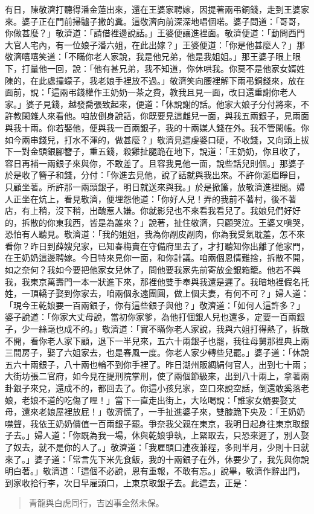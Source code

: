有日，陳敬濟打聽得潘金蓮出來，還在王婆家聘嫁，因提著兩弔銅錢，走到王婆家來。婆子正在門前掃驢子撒的糞。這敬濟向前深深地唱個喏。婆子問道：「哥哥，你做甚麼？」敬濟道：「請借裡邊說話。」王婆便讓進裡面。敬濟便道：「動問西門大官人宅內，有一位娘子潘六姐，在此出嫁？」王婆便道：「你是他甚麼人？」那敬濟嘻嘻笑道：「不瞞你老人家說，我是他兄弟，他是我姐姐。」那王婆子眼上眼下，打量他一回，說：「他有甚兄弟，我不知道，你休哄我。你莫不是他家女婿姓陳的，在此處撞蠓子，我老娘手裡放不過。」敬濟笑向腰裡解下兩弔銅錢來，放在面前，說：「這兩弔錢權作王奶奶一茶之費，教我且見一面，改日還重謝你老人家。」婆子見錢，越發喬張致起來，便道：「休說謝的話。他家大娘子分付將來，不許教閑雜人來看他。咱放倒身說話，你既要見這雌兒一面，與我五兩銀子，見兩面與我十兩。你若娶他，便與我一百兩銀子，我的十兩媒人錢在外。我不管閑帳。你如今兩串錢兒，打水不渾的，做甚麼？」敬濟見這虔婆口硬，不收錢，又向頭上拔下一對金頭銀腳簪子，重五錢，殺雞扯腿跪在地下，說道：「王奶奶，你且收了，容日再補一兩銀子來與你，不敢差了。且容我見他一面，說些話兒則個。」那婆子於是收了簪子和錢，分付：「你進去見他，說了話就與我出來。不許你涎眉睜目，只顧坐著。所許那一兩頭銀子，明日就送來與我。」於是掀簾，放敬濟進裡間。婦人正坐在炕上，看見敬濟，便埋怨他道：「你好人兒！弄的我前不著村，後不著店，有上稍，沒下稍，出醜惹人嫌。你就影兒也不來看我看兒了。我娘兒們好好的，拆散的你東我西，皆是為誰來？」說著，扯住敬濟，只顧哭泣。王婆又嗔哭，恐怕有人聽見。敬濟道：「我的姐姐，我為你剮皮剮肉，你為我受氣耽羞，怎不來看你？昨日到薛嫂兒家，已知春梅賣在守備府里去了，才打聽知你出離了他家門，在王奶奶這邊聘嫁。今日特來見你一面，和你計議。咱兩個恩情難捨，拆散不開，如之奈何？我如今要把他家女兒休了，問他要我家先前寄放金銀箱籠。他若不與我，我東京萬壽門一本一狀進下來，那裡他雙手奉與我還是遲了。我暗地裡假名托姓，一頂轎子娶到你家去，咱兩個永遠團圓，做上個夫妻，有何不可？」婦人道：「現今王乾娘要一百兩銀子，你有這些銀子與他？」敬濟道：「如何人這許多？」婆子說道：「你家大丈母說，當初你家爹，為他打個銀人兒也還多，定要一百兩銀子，少一絲毫也成不的。」敬濟道：「實不瞞你老人家說，我與六姐打得熱了，拆散不開，看你老人家下顧，退下一半兒來，五六十兩銀子也罷，我往母舅那裡典上兩三間房子，娶了六姐家去，也是春風一度。你老人家少轉些兒罷。」婆子道：「休說五六十兩銀子，八十兩也輪不到你手裡了。昨日湖州販綢絹何官人，出到七十兩；大街坊張二官府，如今見在提刑院掌刑，使了兩個節級來，出到八十兩上，拿著兩卦銀子來兌，還成不的，都回去了。你這小孩兒家，空口來說空話，倒還敢奚落老娘，老娘不道的吃傷了哩！」當下一直走出街上，大吆喝說：「誰家女婿要娶丈母，還來老娘屋裡放屁！」敬濟慌了，一手扯進婆子來，雙膝跪下央及：「王奶奶噤聲，我依王奶奶價值一百兩銀子罷。爭奈我父親在東京，我明日起身往東京取銀子去。」婦人道：「你既為我一場，休與乾娘爭執，上緊取去，只恐來遲了，別人娶了奴去，就不是你的人了。」敬濟道：「我雇頭口連夜兼程，多則半月，少則十日就來了。」婆子道：「常言先下米先食飯，我的十兩銀子在外，休要少了，我先與你說明白著。」敬濟道：「這個不必說，恩有重報，不敢有忘。」說畢，敬濟作辭出門，到家收拾行李，次日早雇頭口，上東京取銀子去。此這去，正是：
\begin{quote}
青龍與白虎同行，吉凶事全然未保。
\end{quote}
